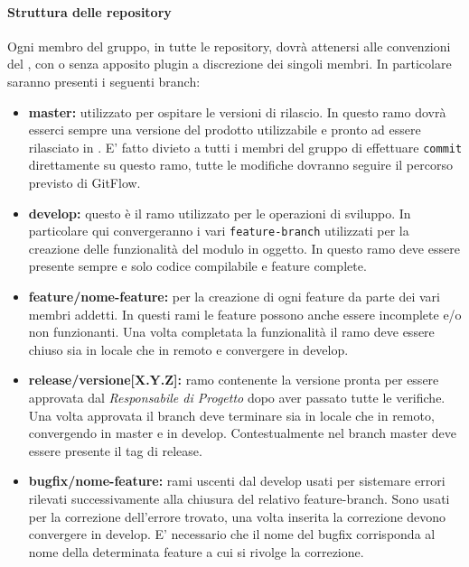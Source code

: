 \paragraph{Struttura delle repository}
Ogni membro del gruppo, in tutte le repository, dovrà attenersi alle convenzioni del , con o senza apposito plugin a discrezione dei singoli membri.
In particolare saranno presenti i seguenti branch:
\begin{itemize}
    \item \textbf{master:} utilizzato per ospitare le versioni di rilascio. In questo ramo dovrà esserci sempre una versione del prodotto utilizzabile
                           e pronto ad essere rilasciato in . E' fatto divieto a tutti i membri del gruppo di effettuare \verb|commit|
                           direttamente su questo ramo, tutte le modifiche dovranno seguire il percorso previsto di GitFlow.
    \item \textbf{develop:} questo è il ramo utilizzato per le operazioni di sviluppo. In particolare qui convergeranno i vari \verb|feature-branch|
                            utilizzati per la creazione delle funzionalità del modulo in oggetto. In questo ramo deve essere presente sempre e solo codice
                            compilabile e feature complete.
    \item \textbf{feature/nome-feature:} per la creazione di ogni feature da parte dei vari membri addetti. In questi rami le feature possono anche essere
                                         incomplete e/o non funzionanti. Una volta completata la funzionalità il ramo deve essere chiuso sia in locale che in remoto e 
                                         convergere in develop.
    \item \textbf{release/versione[X.Y.Z]:} ramo contenente la versione  pronta per essere approvata dal \textit{Responsabile di Progetto} dopo
                                            aver passato tutte le verifiche. Una volta approvata il branch deve terminare sia in locale che in remoto, convergendo in master e in develop.
                                            Contestualmente nel branch master deve essere presente il tag di release.
    \item \textbf{bugfix/nome-feature:} rami uscenti dal develop usati per sistemare errori rilevati successivamente alla chiusura del relativo feature-branch.
                                       Sono usati per la correzione dell'errore trovato, una volta inserita la correzione devono convergere in develop. E' necessario
                                       che il nome del bugfix corrisponda al nome della determinata feature a cui si rivolge la correzione.
\end{itemize}
